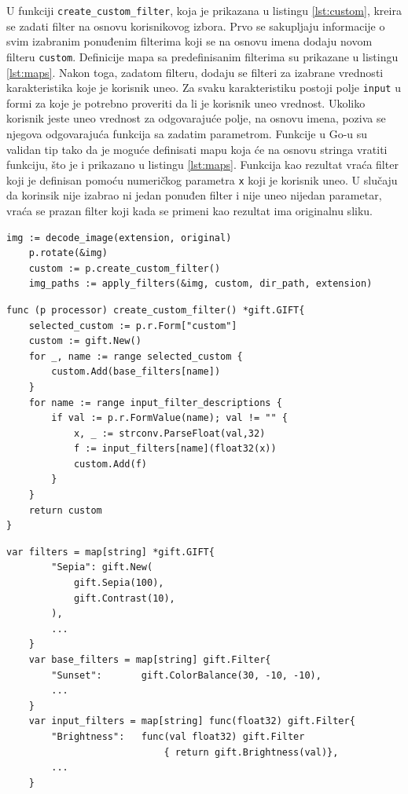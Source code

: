\documentclass[12pt,oneside]{memoir}
\begin{document}
 U funkciji  \texttt{create\_custom\_filter}, koja je prikazana u listingu \ref{lst:custom}, kreira se zadati filter na osnovu korisnikovog izbora. Prvo se sakupljaju informacije o svim izabranim ponuđenim filterima koji se na osnovu imena dodaju novom filteru  \texttt{custom}. Definicije mapa sa predefinisanim filterima su prikazane u listingu \ref{lst:maps}. Nakon toga, zadatom filteru, dodaju se filteri za izabrane vrednosti karakteristika koje je korisnik uneo. Za svaku karakteristiku postoji polje \texttt{input} u formi za koje je potrebno proveriti da li je korisnik uneo vrednost. Ukoliko korisnik jeste uneo vrednost za odgovarajuće polje, na osnovu imena, poziva se njegova odgovarajuća funkcija sa zadatim parametrom. Funkcije u Go-u su validan tip tako da je moguće definisati mapu koja će na osnovu stringa vratiti funkciju, što je i prikazano u listingu \ref{lst:maps}. Funkcija kao rezultat vraća filter koji je definisan pomoću numeričkog parametra  \texttt{x} koji je korisnik uneo. U slučaju da korinsik nije izabrao ni jedan ponuđen filter i nije uneo nijedan parametar, vraća se prazan filter koji kada se primeni kao rezultat ima originalnu sliku.

\begin{center}
\begin{lstlisting}[caption=Primena filtera u funkciji ImageHandler,label={lst:IHfilter},  backgroundcolor=\color{background}]
	img := decode_image(extension, original)
	p.rotate(&img)
	custom := p.create_custom_filter()
	img_paths := apply_filters(&img, custom, dir_path, extension)
\end{lstlisting}
\end{center}

\begin{center}
\begin{lstlisting}[caption=Funkcija za kreiranje zadatog filtera,label={lst:custom}, backgroundcolor=\color{background},belowskip=-0.8 \baselineskip]
func (p processor) create_custom_filter() *gift.GIFT{
	selected_custom := p.r.Form["custom"]
	custom := gift.New()
	for _, name := range selected_custom {
		custom.Add(base_filters[name])
	}
	for name := range input_filter_descriptions {
		if val := p.r.FormValue(name); val != "" {
			x, _ := strconv.ParseFloat(val,32)
			f := input_filters[name](float32(x))
			custom.Add(f)
		}
	}
	return custom
}
\end{lstlisting}
\end{center}

\begin{center}
\begin{lstlisting}[caption=Mape koje se koriste za definisanje različitih vrsta filtera,label={lst:maps},  backgroundcolor=\color{background}]
	var filters = map[string] *gift.GIFT{
		"Sepia": gift.New(
			gift.Sepia(100),
			gift.Contrast(10),
		),
		...
	}
	var base_filters = map[string] gift.Filter{
		"Sunset":      	gift.ColorBalance(30, -10, -10),
		...
	}
	var input_filters = map[string] func(float32) gift.Filter{
		"Brightness":	func(val float32) gift.Filter 
							{ return gift.Brightness(val)},
		...
	}
\end{lstlisting}
\end{center}
\end{document}
